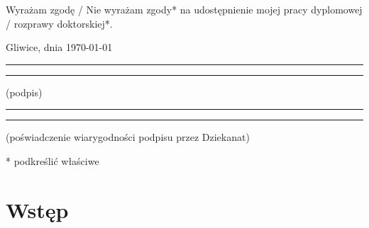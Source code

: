 \documentclass[a4paper, 12pt, twoside]{article}
\begin{document}
\vfill

Wyrażam  zgodę / Nie wyrażam zgody*  na  udostępnienie  mojej  pracy  dyplomowej / rozprawy doktorskiej*.

\vfill

Gliwice, dnia \today

\vfill

\rule{0.5\textwidth}{0cm}\dotfill

\rule{0.5\textwidth}{0cm}
\begin{minipage}{0.45\textwidth}
      {\begin{center}(podpis)\end{center}}
\end{minipage}

\vfill

\rule{0.5\textwidth}{0cm}\dotfill

\rule{0.5\textwidth}{0cm}
\begin{minipage}{0.45\textwidth}
      {\begin{center}\rule{0mm}{5mm}(poświadczenie wiarygodności podpisu przez Dziekanat)\end{center}}
\end{minipage}


\vfill

* podkreślić właściwe


\cleardoublepage

\newcommand{\rightorleftmark}{%
      \begingroup\protected@edef\x{\rightmark}%
      \ifx\x\@empty
            \endgroup\leftmark
      \else
            \endgroup\rightmark
      \fi}
\makeatother


\pagestyle{NumeryStronNazwyRozdzialow}

\tableofcontents

\newpage
\section{Wstęp}\label{intro}
\end{document}
